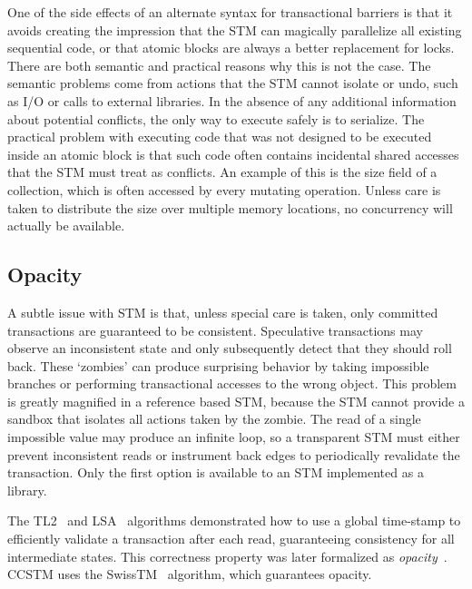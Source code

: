 One of the side effects of an alternate syntax for transactional barriers
is that it avoids creating the impression that the STM can magically
parallelize all existing sequential code, or that atomic blocks are
always a better replacement for locks.  There are both semantic and
practical reasons why this is not the case.  The semantic problems come
from actions that the STM cannot isolate or undo, such as I/O or calls to
external libraries.  In the absence of any additional information about
potential conflicts, the only way to execute safely is to serialize.
The practical problem with executing code that was not designed to
be executed inside an atomic block is that such code often contains
incidental shared accesses that the STM must treat as conflicts.
An example of this is the size field of a collection, which is often
accessed by every mutating operation.  Unless care is taken to distribute
the size over multiple memory locations, no concurrency will actually
be available.

\subsection{Opacity}

A subtle issue with STM is that, unless special care is taken, only
committed transactions are guaranteed to be consistent.  Speculative
transactions may observe an inconsistent state and only subsequently
detect that they should roll back.  These `zombies' can produce
surprising behavior by taking impossible branches or performing
transactional accesses to the wrong object.  This problem is greatly
magnified in a reference based STM, because the STM cannot provide a
sandbox that isolates all actions taken by the zombie.  The read of a
single impossible value may produce an infinite loop, so a transparent
STM must either prevent inconsistent reads or instrument back edges
to periodically revalidate the transaction.  Only the first option is
available to an STM implemented as a library.

The TL2~\cite{dice06tl2} and LSA~\cite{riegel06lsa} algorithms
demonstrated how to use a global time-stamp to efficiently validate
a transaction after each read, guaranteeing consistency for all
intermediate states.  This correctness property was later formalized
as \textit{opacity}~\cite{guerraoui08opacity}.  CCSTM uses the
SwissTM~\cite{dragojevic09swisstm} algorithm, which guarantees opacity.


